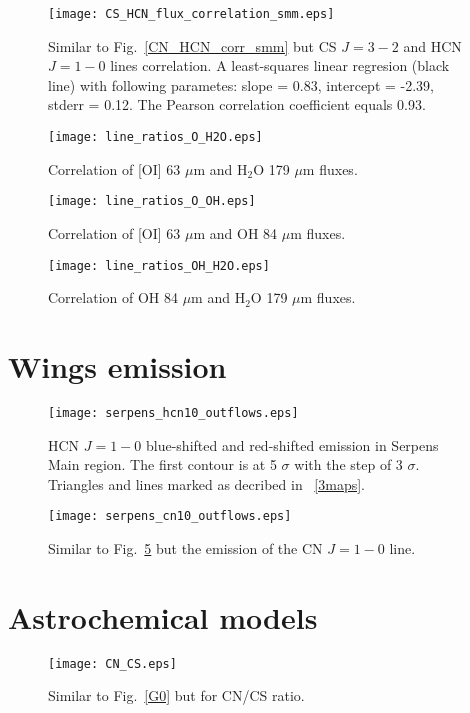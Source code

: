 \documentclass{aa}
\begin{document}
\begin{appendix}
\begin{figure}
\texttt{[image: CS\_HCN\_flux\_correlation\_smm.eps]}
\caption{Similar to Fig.~\ref{CN_HCN_corr_smm} but CS $J=3-2$ and HCN $J=1-0$ lines correlation. A least-squares linear regresion (black line) with following parametes: slope = 0.83, intercept = -2.39, stderr = 0.12. The Pearson correlation coefficient equals 0.93. }
\label{CS_HCN_corr_smm}
\end{figure}

\begin{figure}
\texttt{[image: line\_ratios\_O\_H2O.eps]}
\caption{Correlation of [OI] 63 $\mu$m and H$_2$O 179 $\mu$m fluxes.}
\label{h13cn10}
\end{figure}

\begin{figure}
\texttt{[image: line\_ratios\_O\_OH.eps]}
\caption{Correlation of [OI] 63 $\mu$m and OH 84 $\mu$m fluxes.}
\label{h13cn10}
\end{figure}

\begin{figure}
\texttt{[image: line\_ratios\_OH\_H2O.eps]}
\caption{Correlation of OH 84 $\mu$m and H$_2$O 179 $\mu$m fluxes.}
\label{h13cn10}
\end{figure}

\section{Wings emission}

\begin{figure}
\texttt{[image: serpens\_hcn10\_outflows.eps]}
\caption{HCN $J=1-0$ blue-shifted and red-shifted emission in Serpens Main region. The first contour is at 5 $\sigma$ with the step of 3 $\sigma$. Triangles and lines marked as decribed in ~\ref{3maps}.}
\label{hcn10_blue_red}
\end{figure}

\begin{figure}
\texttt{[image: serpens\_cn10\_outflows.eps]}
\caption{Similar to Fig.~\ref{hcn10_blue_red} but the emission of the CN $J=1-0$ line.}
\label{cn10_blue_red}
\end{figure}

\section{Astrochemical models}
\begin{figure}
   \centering
   \texttt{[image: CN\_CS.eps]}
      \caption{Similar to Fig.~\ref{G0} but for CN/CS ratio.}
         \label{CN/CS}
   \end{figure}


\end{appendix}
\end{document}

